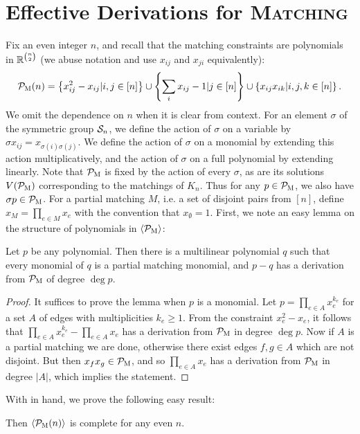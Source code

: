 \section{Effective Derivations for \textsc{Matching}}
Fix an even integer $n$, and recall that the matching constraints are polynomials in $\mathbb R^{\binom{n}{2}}$ (we abuse notation and use $x_{ij}$ and $x_{ji}$ equivalently):
\begin{align}
\mathcal P_{\textsc{M}}(n) = \left\{x_{ij}^2 - x_{ij} | i,j \in [n]\right\} \cup \left\{\sum_i x_{ij} - 1 | j \in [n]\right\} \cup \left\{x_{ij}x_{ik} | i,j,k \in [n]\right\}.\label{eq:matching-formulation}
\end{align}
We omit the dependence on $n$ when it is clear from context. For an element $\sigma$ of the symmetric group $\mathcal S_n$, we define the action of $\sigma$ on a variable by $\sigma x_{ij} = x_{\sigma(i)\sigma(j)}$.
We define the action of $\sigma$ on a monomial by extending this action multiplicatively, and the action of $\sigma$ on a full polynomial by extending linearly.
Note that $\mathcal P_{\textsc{M}}$ is fixed by the action of every $\sigma$, as are its solutions $V(\mathcal P_{\textsc{M}})$ corresponding to the matchings of $K_n$. 
Thus for any $p \in \mathcal P_{\textsc{M}}$, we also have $\sigma p \in \mathcal P_{\textsc{M}}$. For a partial matching $M$, i.e. a set of disjoint pairs from $[n]$, define $x_M = \prod_{e \in M} x_e$ with the convention that $x_{\emptyset} = 1$.
First, we note an easy lemma on the structure of polynomials in $\langle \mathcal P_{\textsc{M}} \rangle$:
\begin{lemma}\label{lem:monomials}
  Let $p$ be any polynomial. Then there is a multilinear polynomial $q$ such that every monomial of $q$ is a partial matching monomial, and $p-q$ has a derivation from $\mathcal P_{\textsc{M}}$ of degree $\deg p$.
\end{lemma}
\begin{proof}
It suffices to prove the lemma when \(p\) is a monomial. Let
\(p = \prod_{e \in A} x_{e}^{k_{e}}\)
for a set \(A\) of edges with multiplicities \(k_{e} \geq 1\).
From the constraint \(x_{e}^{2} - x_e\), it follows that
$\prod_{e \in A} x_e^{k_e} - \prod_{e \in A} x_e$ has a derivation from $\mathcal P_{\textsc{M}}$ in degree $\deg p$.
Now if $A$ is a partial matching we are done, otherwise there exist edges $f,g \in A$ which are not disjoint.
But then $x_fx_g \in \mathcal P_{\textsc{M}}$, and so $\prod_{e \in A} x_e$ has a derivation from $\mathcal P_{\textsc{M}}$ in degree $|A|$, which implies the statement.
\end{proof}
With  in hand, we prove the following easy result:
\begin{lemma}\label{lem:matching-complete}
Then $\langle \mathcal P_{\textsc{M}}(n) \rangle$ is complete for any even $n$. 
\end{lemma}
